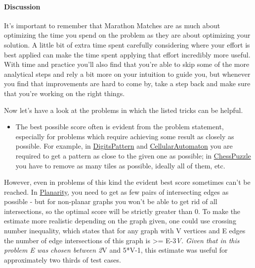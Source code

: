 \hypertarget{discussion-3}{%
\paragraph{Discussion}\label{discussion-3}}

It's important to remember that Marathon Matches are as much about
optimizing the time you spend on the problem as they are about
optimizing your solution. A little bit of extra time spent carefully
considering where your effort is best applied can make the time spent
applying that effort incredibly more useful. With time and practice
you'll also find that you're able to skip some of the more analytical
steps and rely a bit more on your intuition to guide you, but whenever
you find that improvements are hard to come by, take a step back and
make sure that you're working on the right things.

Now let's have a look at the problems in which the listed tricks can be
helpful.

\begin{itemize}
\tightlist
\item
  The best possible score often is evident from the problem statement,
  especially for problems which require achieving some result as closely
  as possible. For example, in
  \href{http://www.topcoder.com/longcontest/?module=ViewProblemStatement\&rd=14412\&pm=11123}{DigitsPattern}
  and
  \href{http://www.topcoder.com/longcontest/?module=ViewProblemStatement\&rd=14339\&pm=10989}{CellularAutomaton}
  you are required to get a pattern as close to the given one as
  possible; in
  \href{http://www.topcoder.com/longcontest/?module=ViewProblemStatement\&rd=14195\&pm=10728}{ChessPuzzle}
  you have to remove as many tiles as possible, ideally all of them,
  etc.
\end{itemize}

However, even in problems of this kind the evident best score sometimes
can't be reached. In
\href{http://www.topcoder.com/longcontest/?module=ViewProblemStatement\&rd=14300\&pm=10942}{Planarity},
you need to get as few pairs of intersecting edges as possible - but for
non-planar graphs you won't be able to get rid of all intersections, so
the optimal score will be strictly greater than 0. To make the estimate
more realistic depending on the graph given, one could use crossing
number inequality, which states that for any graph with V vertices and E
edges the number of edge intersections of this graph is \textgreater{}=
E-3\emph{V. Given that in this problem E was chosen between 2}V and
5*V-1, this estimate was useful for approximately two thirds of test
cases.

